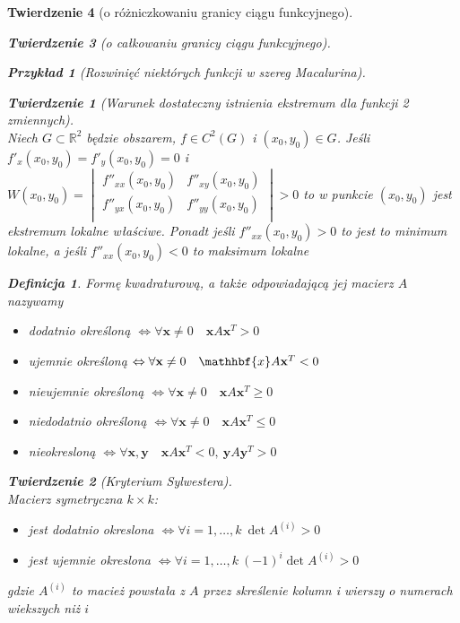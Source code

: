 \documentclass[12pt,a4paper]{article}
\newtheorem{tw}{Twierdzenie}
\newtheorem{przyklad}{Przykład}
\theoremstyle{definition}
\newtheorem{df}{Definicja}
\begin{document}
\begin{tw}[o różniczkowaniu granicy ciągu funkcyjnego]
\begin{tw}[o całkowaniu granicy ciągu funkcyjnego]
\begin{przyklad}[Rozwinięć niektórych funkcji w szereg Macalurina]
\begin{tw}[Warunek dostateczny istnienia ekstremum dla funkcji 2 zmiennych]~\\
Niech $G\subset \mathbb{R}^2$ będzie obszarem, $f\in C^2(G)$ i $(x_0,y_0) \in G$. Jeśli $f'_x(x_0, y_0) = f'_y(x_0,y_0) = 0$ i $W(x_0,y_0) = 
\begin{vmatrix}
	f''_{xx}(x_0,y_0) & f''_{xy}(x_0,y_0)\\
	f''_{yx}(x_0,y_0) & f''_{yy}(x_0,y_0)\\
\end{vmatrix} > 0$ to w punkcie $(x_0,y_0)$ jest ekstremum lokalne właściwe. Ponadt jeśli $f''_{xx}(x_0,y_0)>0$ to jest to minimum lokalne, a jeśli $f''_{xx}(x_0,y_0)<0$ to maksimum lokalne
\end{tw}

\begin{df}
Formę kwadraturową, a także odpowiadającą jej macierz $A$ nazywamy
\begin{itemize}
	\item dodatnio określoną $\Leftrightarrow \forall \mathbf{x}\neq 0 \quad \mathbf{x}A\mathbf{x}^T > 0$
	\item ujemnie określoną $\Leftrightarrow \forall \mathbf{x}\neq 0 \quad \mathhbf{x}A\mathbf{x}^T < 0$
	\item nieujemnie określoną $\Leftrightarrow \forall \mathbf{x}\neq 0 \quad \mathbf{x}A\mathbf{x}^T \geqslant 0$
	\item niedodatnio określoną $\Leftrightarrow \forall \mathbf{x}\neq 0 \quad \mathbf{x}A\mathbf{x}^T \leqslant 0$	
	\item nieokresloną $\Leftrightarrow \forall \mathbf{x,y} \quad \mathbf{x}A\mathbf{x}^T < 0,~ \mathbf{y}A\mathbf{y}^T > 0$
\end{itemize}
\end{df}

\begin{tw}[Kryterium Sylwestera]~\\
Macierz symetryczna $k\times k$:
\begin{itemize}
	\item jest dodatnio okreslona $\Leftrightarrow \forall i=1,\dots ,k ~ \det A^{(i)}>0$
	\item jest ujemnie okreslona $\Leftrightarrow \forall i=1,\dots ,k ~ (-1)^i\det A^{(i)}>0$
\end{itemize}
gdzie $A^{(i)}$ to macież powstała z $A$ przez skreślenie kolumn i wierszy o numerach wiekszych niż $i$
\end{tw}


\end{przyklad}
\end{tw}
\end{tw}
\end{document}
